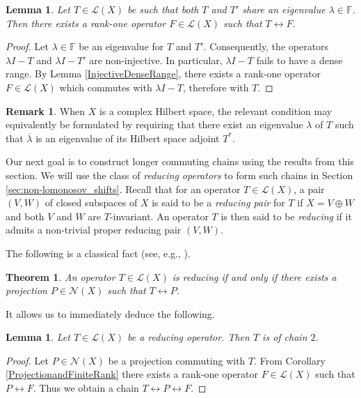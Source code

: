 \documentclass[a4paper,12pt]{article}
\newtheorem{theorem}[thm]{Theorem}
\newtheorem{lemma}[thm]{Lemma}
\theoremstyle{definition}
\newtheorem{remark}[thm]{Remark}
\numberwithin{equation}{section}
\numberwithin{thm}{section}
\begin{document}
\begin{lemma}
\label{Eigenvalue}
Let $T\in \mathcal{L}(X)$ be such that both $T$ and $T'$ share an eigenvalue $\lambda \in \mathbb{F}$. Then there exists a rank-one operator $F\in \mathcal{L}(X)$ such that $T \leftrightarrow F$.
\end{lemma}

\begin{proof}
Let $\lambda \in \mathbb{F}$ be an eigenvalue for $T$ and $T'$. Consequently, the operators $\lambda I - T$ and $\lambda I - T'$ are non-injective. In particular, $\lambda I-T$ fails to have a dense range. By Lemma \ref{InjectiveDenseRange}, there exists a rank-one operator $F\in \mathcal{L}(X)$ which commutes with $\lambda I-T$, therefore with $T$.
\end{proof}

\begin{remark}
When $X$ is a complex Hilbert space, the relevant condition may equivalently be formulated by requiring that there exist an eigenvalue $\lambda$ of $T$ such that $\overline{\lambda}$ is an eigenvalue of its Hilbert space adjoint $T^*$.
\end{remark}

Our next goal is to construct longer commuting chains using the results from this section. We will use the class of \textit{reducing operators} to form such chains in Section \ref{sec:non-lomonosov_shifts}. Recall that for an operator $T\in \mathcal{L}(X)$, a pair $(V,W)$ of closed subspaces of $X$ is said to be a \textit{reducing pair} for $T$ if $X=V\oplus W$ and both $V$ and $W$ are $T$-invariant. An operator $T$ is then said to be \textit{reducing} if it admits a non-trivial proper reducing pair $(V,W)$.

The following is a classical fact (see, e.g., \cite[Theorem 2.22]{Invitation}).

\begin{theorem}
\label{ReducingCommutes}
An operator $T\in \mathcal{L}(X)$ is reducing if and only if there exists a projection $P\in \mathcal{N}(X)$ such that $T\leftrightarrow P$.  
\end{theorem}

It allows us to immediately deduce the following.

\begin{lemma}
\label{ReducingIsLomonosov}
Let $T\in \mathcal{L}(X)$ be a reducing operator. Then $T$ is of chain $2$.
\end{lemma}
\begin{proof}
Let $P\in \mathcal{N}(X)$ be a projection commuting with $T$. From Corollary \ref{ProjectionandFiniteRank} there exists a rank-one operator $F\in \mathcal{L}(X)$ such that $P \leftrightarrow F$. Thus we obtain a chain $T \leftrightarrow P \leftrightarrow F$. 
\end{proof}
\end{document}
